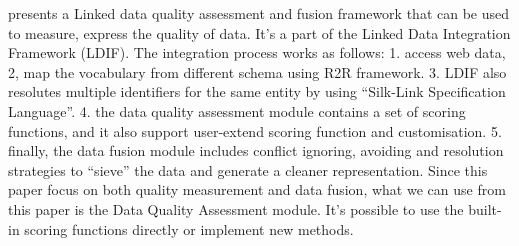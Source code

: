\cite{mendes2012} presents a Linked data quality assessment and fusion framework that can be used to measure, express the quality of data. It's a part of the Linked Data Integration Framework (LDIF). The integration process works as follows: 1. access web data, 2, map the vocabulary from different schema using R2R framework. 3. LDIF also resolutes multiple identifiers for the same entity by using ``Silk-Link Specification Language''. 4. the data quality assessment module contains a set of scoring functions, and it also support user-extend scoring function and customisation. 5. finally, the data fusion module includes conflict ignoring, avoiding and resolution strategies to ``sieve'' the data and generate a cleaner representation. Since this paper focus on both quality measurement and data fusion, what we can use from this paper is the Data Quality Assessment module. It's possible to use the built-in scoring functions directly or implement new methods.

